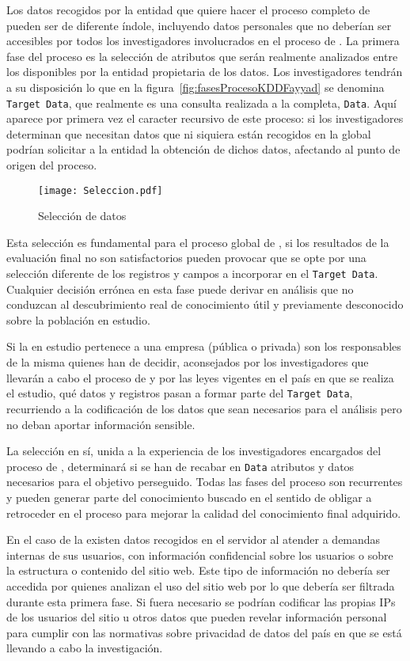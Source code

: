 Los datos recogidos por la entidad que quiere hacer el proceso completo de \KDD pueden ser de diferente índole, incluyendo datos personales que no deberían ser accesibles por todos los investigadores involucrados en el proceso de \KDD. La primera fase del proceso es la selección de atributos que serán realmente analizados entre los disponibles por la entidad propietaria de los datos. Los investigadores tendrán a su disposición lo que en la figura~\ref{fig:fasesProcesoKDDFayyad} se denomina \texttt{Target Data}, que realmente es una consulta realizada a la \db completa, \texttt{Data}. Aquí aparece por primera vez el caracter recursivo de este proceso: si los investigadores determinan que necesitan datos que ni siquiera están recogidos en la \db global podrían solicitar a la entidad la obtención de dichos datos, afectando al punto de origen del proceso.

\begin{wrapfigure}{o}{0.45\textwidth}
  \centering
  \texttt{[image: Seleccion.pdf]}
	\caption{Selección de datos}
	\label{fig:SeleccionDeDatos}
\end{wrapfigure}
Esta selección es fundamental para el proceso global de \KDD, si los resultados de la evaluación final no son satisfactorios pueden provocar que se opte por una selección diferente de los registros y campos a incorporar en el \texttt{Target Data}. Cualquier decisión errónea en esta fase puede derivar en análisis que no conduzcan al descubrimiento real de conocimiento útil y previamente desconocido sobre la población en estudio.

Si la \db en estudio pertenece a una empresa (pública o privada) son los responsables de la misma quienes han de decidir, aconsejados por los investigadores que llevarán a cabo el proceso de \KDD y por las leyes vigentes en el país en que se realiza el estudio, qué datos y registros pasan a formar parte del \texttt{Target Data}, recurriendo a la codificación de los datos que sean necesarios para el análisis pero no deban aportar información sensible.

La selección en sí, unida a la experiencia de los investigadores encargados del proceso de \KDD, determinará si se han de recabar en \texttt{Data} atributos y datos necesarios para el objetivo perseguido. Todas las fases del proceso son recurrentes y pueden generar parte del conocimiento buscado en el sentido de obligar a retroceder en el proceso para mejorar la calidad del conocimiento final adquirido. 

En el caso de la \WUM existen datos recogidos en el servidor al atender a demandas internas de sus usuarios, con información confidencial sobre los usuarios o sobre la estructura o contenido del sitio web. Este tipo de información no debería ser accedida por quienes analizan el uso del sitio web por lo que debería ser filtrada durante esta primera fase. Si fuera necesario se podrían codificar las propias IPs de los usuarios del sitio u otros datos que pueden revelar información personal para cumplir con las normativas sobre privacidad de datos del país en que se está llevando a cabo la investigación\citep{LamFrankowskiRiedl-DoYouTrustYourRecommendations-2006,RozenbergGudes-ARMInVerticallyPartitionedDBs-2006}.
